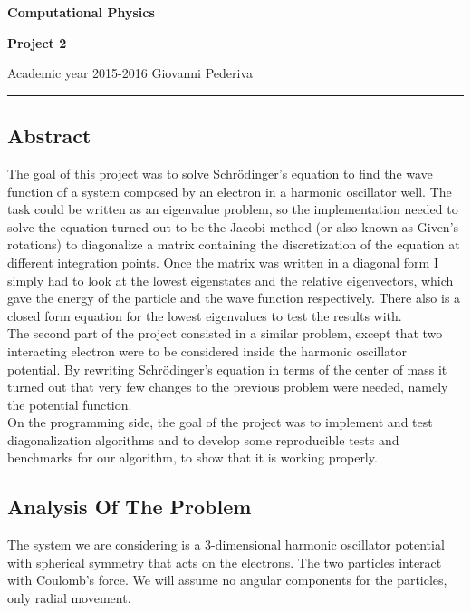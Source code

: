 \documentclass[10pt,a4paper,titlepage]{article}
\begin{document}
\begin{center}
{\LARGE \bfseries Computational Physics\par}
\vspace{0.5cm}
{\LARGE \bfseries Project 2 \par}
\end{center}

\vspace{1cm}

Academic year 2015-2016	 \hfill Giovanni Pederiva     

\begin{center}
\hrule height 2 pt
\end{center} 


\subsection*{Abstract}
The goal of this project was to solve Schr\"odinger's equation to find the wave function of a system composed by an electron in a harmonic oscillator 
well. The task could be written as an eigenvalue problem, so the implementation needed to solve the equation turned out to be the Jacobi method 
(or also known as Given's rotations) to diagonalize a matrix containing the discretization of the equation at different integration points. Once the 
matrix was written in a diagonal form I simply had to look at the lowest eigenstates and the relative eigenvectors, which gave the energy of the particle 
and the wave function respectively. There also is a closed form equation for the lowest eigenvalues to test the results with.\\
The second part of the project consisted in a similar problem, except that two interacting electron were to be considered inside the harmonic oscillator
potential. By rewriting Schr\"odinger's equation in terms of the center of mass it turned out that very few changes to the previous problem were needed, 
namely the potential function.\\
On the programming side, the goal of the project was to implement and test diagonalization algorithms and to develop some reproducible tests and 
benchmarks for our algorithm, to show that it is working properly.

\subsection*{Analysis Of The Problem}
The system we are considering is a 3-dimensional harmonic oscillator potential with spherical symmetry that acts on the electrons. The two particles 
interact with Coulomb's force. We will assume no angular components for the particles, only radial movement.\\
\end{document}
